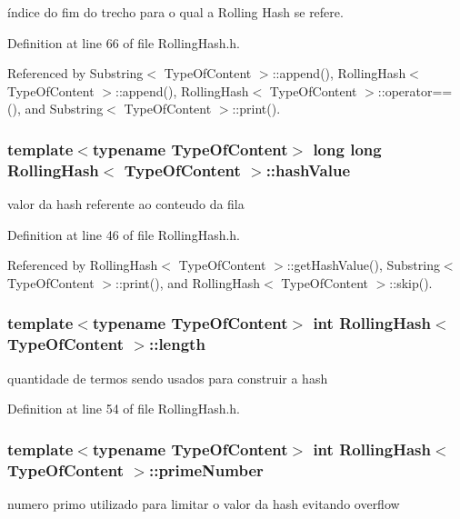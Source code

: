 índice do fim do trecho para o qual a Rolling Hash se refere. 



Definition at line 66 of file Rolling\+Hash.\+h.



Referenced by Substring$<$ Type\+Of\+Content $>$\+::append(), Rolling\+Hash$<$ Type\+Of\+Content $>$\+::append(), Rolling\+Hash$<$ Type\+Of\+Content $>$\+::operator==(), and Substring$<$ Type\+Of\+Content $>$\+::print().

\hypertarget{classRollingHash_af12ead08746ce29672d41151f0d3ac21}{
\subsubsection[{hash\+Value}]{\setlength{\rightskip}{0pt plus 5cm}template$<$typename Type\+Of\+Content$>$ long long {\bf Rolling\+Hash}$<$ Type\+Of\+Content $>$\+::hash\+Value}}\label{classRollingHash_af12ead08746ce29672d41151f0d3ac21}


valor da hash referente ao conteudo da fila 



Definition at line 46 of file Rolling\+Hash.\+h.



Referenced by Rolling\+Hash$<$ Type\+Of\+Content $>$\+::get\+Hash\+Value(), Substring$<$ Type\+Of\+Content $>$\+::print(), and Rolling\+Hash$<$ Type\+Of\+Content $>$\+::skip().

\hypertarget{classRollingHash_ae2e7e5cffeada00e493fbd9daed2a298}{
\subsubsection[{length}]{\setlength{\rightskip}{0pt plus 5cm}template$<$typename Type\+Of\+Content$>$ int {\bf Rolling\+Hash}$<$ Type\+Of\+Content $>$\+::length}}\label{classRollingHash_ae2e7e5cffeada00e493fbd9daed2a298}


quantidade de termos sendo usados para construir a hash 



Definition at line 54 of file Rolling\+Hash.\+h.

\hypertarget{classRollingHash_a5b021104f9f93bb2265a2046d7edaaed}{
\subsubsection[{prime\+Number}]{\setlength{\rightskip}{0pt plus 5cm}template$<$typename Type\+Of\+Content$>$ int {\bf Rolling\+Hash}$<$ Type\+Of\+Content $>$\+::prime\+Number}}\label{classRollingHash_a5b021104f9f93bb2265a2046d7edaaed}
numero primo utilizado para limitar o valor da hash evitando overflow 

